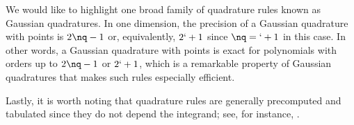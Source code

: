 We would like to highlight one broad family of quadrature rules known as
Gaussian quadratures. In one dimension, the precision of a Gaussian quadrature
with \nq points is $2 \nq - 1$ \cite{heiss2008} or, equivalently, $2 \lq + 1$
since $\nq = \lq + 1$ in this case. In other words, a Gaussian quadrature with
\nq points is exact for polynomials with orders up to $2 \nq - 1$ or $2 \lq +
1$, which is a remarkable property of Gaussian quadratures that makes such rules
especially efficient.

Lastly, it is worth noting that quadrature rules are generally precomputed and
tabulated since they do not depend the integrand; see, for instance,
\cite{burkardt}.
